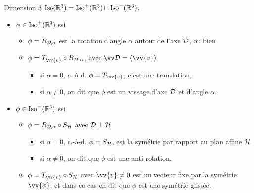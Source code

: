 \documentclass[bigger]{m53beamer}
\begin{document}
\begin{frame}{Dimension 3}
    $\operatorname{Iso}(\mathbb{R}^{3}) = \operatorname{Iso}^{+}(\mathbb{R}^{3}) \sqcup \operatorname{Iso}^{-}(\mathbb{R}^{3})$.
      \begin{itemize}[<+(1)->]
        \item $\phi\in\operatorname{Iso}^{+}(\mathbb{R}^{3})$ ssi
          \begin{itemize}[<+(1)->]
            \item $\phi = R_{\mathcal{D},\alpha}$ est la rotation d'angle $\alpha$ autour de l'axe $\mathcal{D}$, ou bien
            \item $\phi = T_{\vv{v}}\circ R_{\ens{D},\alpha}$, avec $\ev{D}=\affspan{\vv{v}}$
            \begin{itemize}[<+(1)->]
              \item si $\alpha=0$, c.-à-d. $\phi = T_{\vv{v}}$, c'est une translation,
              \item si $\alpha\neq 0$, on dit que $\phi$ est un \alert{vissage} d'axe $\mathcal{D}$ et d'angle $\alpha$.
            \end{itemize}
          \end{itemize}
        \item $\phi\in\operatorname{Iso}^{-}(\mathbb{R}^{3})$ ssi
          \begin{itemize}[<+(1)->]
            \item $\phi = R_{\mathcal{D},\alpha}\circ S_{\mathcal{H}}$ avec $\mathcal{D}\perp\mathcal{H}$
            \begin{itemize}[<+(1)->]
              \item si $\alpha=0$, c.-à-d. $\phi = S_{\mathcal{H}}$, est la symétrie par rapport au plan affine $\mathcal{H}$
              \item si $\alpha\neq 0$, on dit que $\phi$ est une \alert{anti-rotation}.
            \end{itemize}
            \item $\phi = T_{\vv{v}}\circ S_{\ens{H}}$ avec $\vv{v}\neq0$ est un vecteur fixe par la symétrie $\vv{\phi}$\pause, et dans ce cas on dit que $\phi$ est une \alert{symétrie glissée}.
          \end{itemize}
      \end{itemize}\pause
\end{frame}

\end{document}
